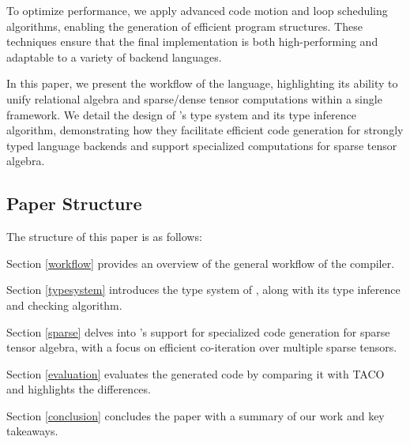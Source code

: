 \documentclass[acmsmall,nonacm]{acmart}\settopmatter{printfolios=true,printccs=false,printacmref=false}
\newcommand{\rhyme}{\text{Rhyme}\xspace}
\begin{document}
To optimize performance, we apply advanced code motion and loop scheduling algorithms, enabling the generation of efficient program structures. These techniques ensure that the final implementation is both high-performing and adaptable to a variety of backend languages.\par

In this paper, we present the workflow of the \rhyme language, highlighting its ability to unify relational algebra and sparse/dense tensor computations within a single framework. We detail the design of \rhyme's type system and its type inference algorithm, demonstrating how they facilitate efficient code generation for strongly typed language backends and support specialized computations for sparse tensor algebra.
\subsection{Paper Structure}

The structure of this paper is as follows:\par \par
Section \ref{workflow} provides an overview of the general workflow of the \rhyme compiler.\par
Section \ref{typesystem} introduces the type system of \rhyme, along with its type inference and checking algorithm.\par
Section \ref{sparse} delves into \rhyme's support for specialized code generation for sparse tensor algebra, with a focus on efficient co-iteration over multiple sparse tensors.\par
Section \ref{evaluation} evaluates the generated code by comparing it with TACO and highlights the differences.\par
Section \ref{conclusion} concludes the paper with a summary of our work and key takeaways.\par
\end{document}
